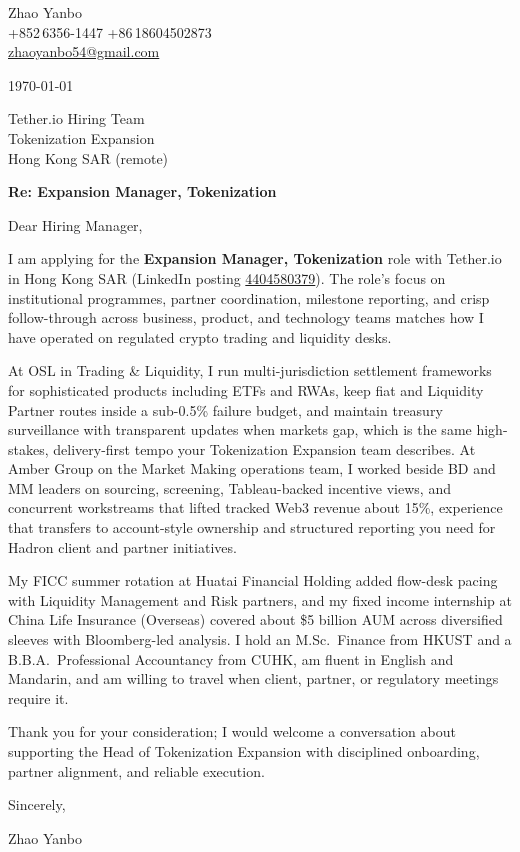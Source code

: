 \documentclass[10pt,a4paper]{article}
\begin{document}
\begin{flushleft}
  Zhao Yanbo\\
  +852\,6356-1447 \;\textbar\; +86\,18604502873\\
  \href{mailto:zhaoyanbo54@gmail.com}{zhaoyanbo54@gmail.com}
\end{flushleft}

\vspace{1em}

\begin{flushright}
  \today
\end{flushright}

\vspace{0.75em}

Tether.io Hiring Team\\
Tokenization Expansion\\
Hong Kong SAR (remote)

\vspace{1em}

\textbf{Re: Expansion Manager, Tokenization}

\vspace{0.75em}

Dear Hiring Manager,

I am applying for the \textbf{Expansion Manager, Tokenization} role with Tether.io in Hong Kong SAR (LinkedIn posting \href{https://www.linkedin.com/jobs/view/4404580379/}{4404580379}). The role’s focus on institutional programmes, partner coordination, milestone reporting, and crisp follow-through across business, product, and technology teams matches how I have operated on regulated crypto trading and liquidity desks.

At OSL in Trading \& Liquidity, I run multi-jurisdiction settlement frameworks for sophisticated products including ETFs and RWAs, keep fiat and Liquidity Partner routes inside a sub-0.5\% failure budget, and maintain treasury surveillance with transparent updates when markets gap, which is the same high-stakes, delivery-first tempo your Tokenization Expansion team describes. At Amber Group on the Market Making operations team, I worked beside BD and MM leaders on sourcing, screening, Tableau-backed incentive views, and concurrent workstreams that lifted tracked Web3 revenue about 15\%, experience that transfers to account-style ownership and structured reporting you need for Hadron client and partner initiatives.

My FICC summer rotation at Huatai Financial Holding added flow-desk pacing with Liquidity Management and Risk partners, and my fixed income internship at China Life Insurance (Overseas) covered about \$5 billion AUM across diversified sleeves with Bloomberg-led analysis. I hold an M.Sc.\ Finance from HKUST and a B.B.A.\ Professional Accountancy from CUHK, am fluent in English and Mandarin, and am willing to travel when client, partner, or regulatory meetings require it.

Thank you for your consideration; I would welcome a conversation about supporting the Head of Tokenization Expansion with disciplined onboarding, partner alignment, and reliable execution.

\vspace{1em}

Sincerely,

\vspace{2em}

Zhao Yanbo
\end{document}
